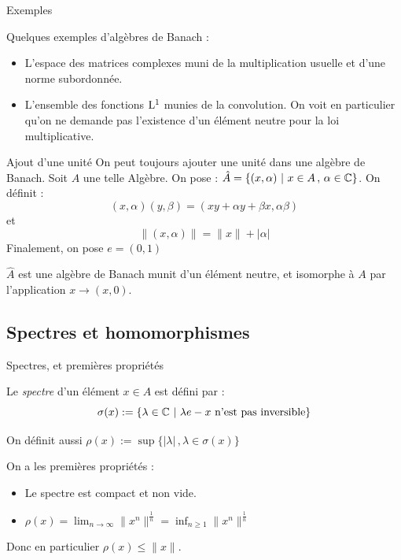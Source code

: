 \documentclass[11pt, xcolor=table]{beamer}
\begin{document}
\begin{frame}{Exemples}
    
\begin{ex}
    Quelques exemples d'algèbres de Banach  :

    \begin{itemize}
        \item L'espace des matrices complexes muni de la multiplication usuelle et d'une norme subordonnée. 
        \item L'ensemble des fonctions $\mathrm{L}^1$ munies de la convolution. On voit en particulier qu'on ne demande pas
            l'existence d'un élément neutre pour la loi multiplicative.
    \end{itemize}
    \end{ex}
\end{frame}

\begin{frame}{Ajout d'une unité}
    On peut toujours ajouter une unité dans une algèbre de Banach. Soit $A$ une telle Algèbre.
    On pose :
    $\hat{A} = \{ ( x, \alpha) \ | \ x \in A \, ,\, \alpha \in \mathbb{C} \}$. On définit :
    \[
        (x, \alpha) ( y, \beta) = (xy + \alpha y + \beta x, \alpha \beta )
        \]
    et 
    \[
        \| (x, \alpha) \| = \|x\| + |\alpha|
        \]
    Finalement, on pose $e = (0, 1)$
    \begin{myth}
        $\hat{A}$ est une algèbre de Banach munit d'un élément neutre, et isomorphe à $A$ par l'application $x \to (x, 0) $.
    \end{myth}
\end{frame}

\subsection{Spectres et homomorphismes}

\begin{frame}{Spectres, et premières propriétés}
    \begin{mydef}
        Le \emph{spectre} d'un élément $x \in A$ est défini par :
        \[
            \sigma(x) := \{ \lambda \in \mathbb{C} \ | \ \lambda e - x  \ \text{n'est pas inversible} \} 
        \]
    \end{mydef}
    On définit aussi $\rho(x) := \sup \{ |\lambda| \, , \lambda \in \sigma(x) \}$

    On a les premières propriétés :

    \begin{myth}
        \begin{itemize}
                \item Le spectre est compact et non vide.
                \item $\rho(x) = \lim_{n \longrightarrow \infty} \| x^n \|^\frac{1}{n} = \inf_{n \geq 1} \| x^n \|^\frac{1}{n}$
        \end{itemize}
        Donc en particulier $\rho(x) \leq \| x \| $.
    \end{myth}
\end{frame}
\end{document}
